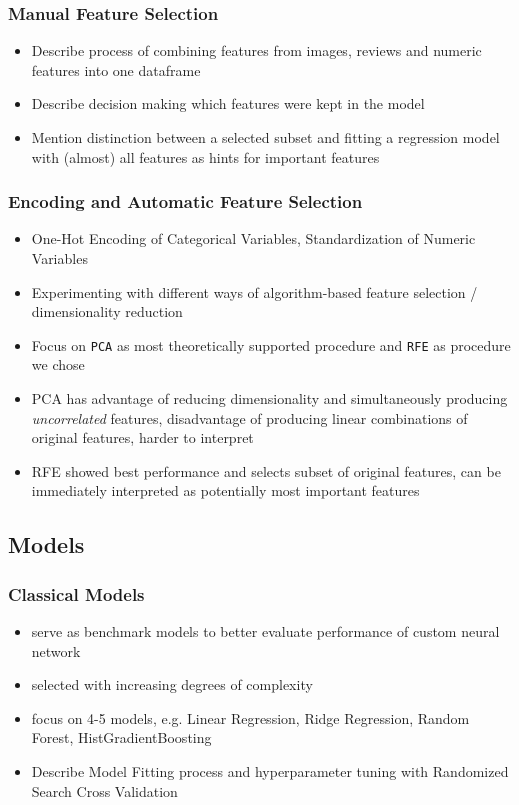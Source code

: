 \documentclass[12pt, letterpaper]{article}
\begin{document}
\subsubsection{Manual Feature Selection}
\begin{itemize}
    \item Describe process of combining features from images, reviews and numeric features into one dataframe
    \item Describe decision making which features were kept in the model
    \item Mention distinction between a selected subset and fitting a regression model with (almost) all features as hints for important features
\end{itemize}


\subsubsection{Encoding and Automatic Feature Selection}
\begin{itemize}
    \item One-Hot Encoding of Categorical Variables, Standardization of Numeric Variables
    \item Experimenting with different ways of algorithm-based feature selection / dimensionality reduction
    \item Focus on \texttt{PCA} as most theoretically supported procedure and \texttt{RFE} as procedure we chose
    \item PCA has advantage of reducing dimensionality and simultaneously producing \emph{uncorrelated} features, disadvantage of producing linear combinations of original features, harder to interpret
    \item RFE showed best performance and selects subset of original features, can be immediately interpreted as potentially most important features
\end{itemize}


\subsection{Models}

\subsubsection{Classical Models}
\begin{itemize}
    \item serve as benchmark models to better evaluate performance of custom neural network
    \item selected with increasing degrees of complexity
    \item focus on 4-5 models, e.g. Linear Regression, Ridge Regression, Random Forest, HistGradientBoosting
    \item Describe Model Fitting process and hyperparameter tuning with Randomized Search Cross Validation
\end{itemize}
\end{document}
